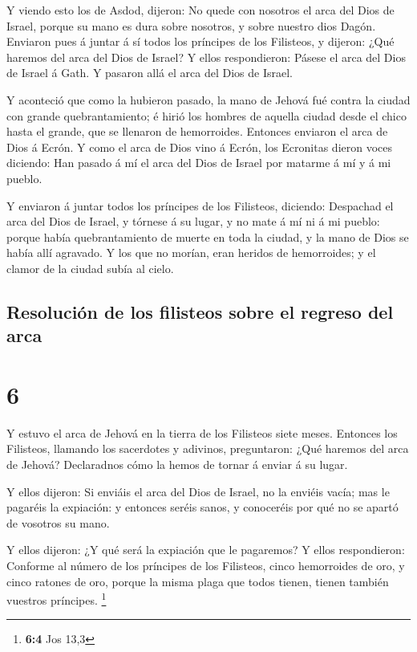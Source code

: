  Y viendo esto los de Asdod, dijeron: No quede con nosotros
el arca del Dios de Israel, porque su mano es dura sobre nosotros, y
sobre nuestro dios Dagón.  Enviaron pues á juntar á sí todos
los príncipes de los Filisteos, y dijeron: ¿Qué haremos del arca del
Dios de Israel? Y ellos respondieron: Pásese el arca del Dios de Israel
á Gath. Y pasaron allá el arca del Dios de Israel.

 Y aconteció que como la hubieron pasado, la mano de Jehová
fué contra la ciudad con grande quebrantamiento; é hirió los hombres de
aquella ciudad desde el chico hasta el grande, que se llenaron de
hemorroides.  Entonces enviaron el arca de Dios á Ecrón. Y
como el arca de Dios vino á Ecrón, los Ecronitas dieron voces diciendo:
Han pasado á mí el arca del Dios de Israel por matarme á mí y á mi
pueblo.

 Y enviaron á juntar todos los príncipes de los Filisteos,
diciendo: Despachad el arca del Dios de Israel, y tórnese á su lugar, y
no mate á mí ni á mi pueblo: porque había quebrantamiento de muerte en
toda la ciudad, y la mano de Dios se había allí agravado. 
Y los que no morían, eran heridos de hemorroides; y el clamor de la
ciudad subía al cielo.

\hypertarget{resoluciuxf3n-de-los-filisteos-sobre-el-regreso-del-arca}{%
\subsection{Resolución de los filisteos sobre el regreso del
arca}\label{resoluciuxf3n-de-los-filisteos-sobre-el-regreso-del-arca}}

\hypertarget{section-5}{%
\section{6}\label{section-5}}

 Y estuvo el arca de Jehová en la tierra de los Filisteos
siete meses.  Entonces los Filisteos, llamando los
sacerdotes y adivinos, preguntaron: ¿Qué haremos del arca de Jehová?
Declaradnos cómo la hemos de tornar á enviar á su lugar.

 Y ellos dijeron: Si enviáis el arca del Dios de Israel, no
la enviéis vacía; mas le pagaréis la expiación: y entonces seréis sanos,
y conoceréis por qué no se apartó de vosotros su mano.

 Y ellos dijeron: ¿Y qué será la expiación que le pagaremos?
Y ellos respondieron: Conforme al número de los príncipes de los
Filisteos, cinco hemorroides de oro, y cinco ratones de oro, porque la
misma plaga que todos tienen, tienen también vuestros príncipes.
\footnote{\textbf{6:4} Jos 13,3}

